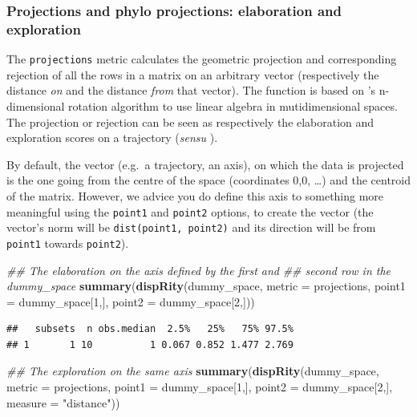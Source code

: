 \documentclass[
]{book}
\newenvironment{Shaded}{\begin{snugshade}}{\end{snugshade}}
\newcommand{\CommentTok}[1]{\textcolor[rgb]{0.56,0.35,0.01}{\textit{#1}}}
\newcommand{\DataTypeTok}[1]{\textcolor[rgb]{0.13,0.29,0.53}{#1}}
\newcommand{\DecValTok}[1]{\textcolor[rgb]{0.00,0.00,0.81}{#1}}
\newcommand{\KeywordTok}[1]{\textcolor[rgb]{0.13,0.29,0.53}{\textbf{#1}}}
\newcommand{\NormalTok}[1]{#1}
\newcommand{\StringTok}[1]{\textcolor[rgb]{0.31,0.60,0.02}{#1}}
\begin{document}
\hypertarget{projections}{%
\subsubsection{Projections and phylo projections: elaboration and exploration}\label{projections}}

The \texttt{projections} metric calculates the geometric projection and corresponding rejection of all the rows in a matrix on an arbitrary vector (respectively the distance \emph{on} and the distance \emph{from} that vector). The function is based on \citet{aguilera2004}'s n-dimensional rotation algorithm to use linear algebra in mutidimensional spaces. The projection or rejection can be seen as respectively the elaboration and exploration scores on a trajectory (\emph{sensu} \citet{endler2005}).

By default, the vector (e.g.~a trajectory, an axis), on which the data is projected is the one going from the centre of the space (coordinates 0,0, \ldots) and the centroid of the matrix.
However, we advice you do define this axis to something more meaningful using the \texttt{point1} and \texttt{point2} options, to create the vector (the vector's norm will be \texttt{dist(point1,\ point2)} and its direction will be from \texttt{point1} towards \texttt{point2}).

\begin{Shaded}
\begin{Highlighting}[]
\CommentTok{\#\# The elaboration on the axis defined by the first and}
\CommentTok{\#\# second row in the dummy\_space}
\KeywordTok{summary}\NormalTok{(}\KeywordTok{dispRity}\NormalTok{(dummy\_space, }\DataTypeTok{metric =}\NormalTok{ projections,}
                              \DataTypeTok{point1 =}\NormalTok{ dummy\_space[}\DecValTok{1}\NormalTok{,],}
                              \DataTypeTok{point2 =}\NormalTok{ dummy\_space[}\DecValTok{2}\NormalTok{,]))}
\end{Highlighting}
\end{Shaded}

\begin{verbatim}
##   subsets  n obs.median  2.5%   25%   75% 97.5%
## 1       1 10          1 0.067 0.852 1.477 2.769
\end{verbatim}

\begin{Shaded}
\begin{Highlighting}[]
\CommentTok{\#\# The exploration on the same axis}
\KeywordTok{summary}\NormalTok{(}\KeywordTok{dispRity}\NormalTok{(dummy\_space, }\DataTypeTok{metric =}\NormalTok{ projections,}
                              \DataTypeTok{point1 =}\NormalTok{ dummy\_space[}\DecValTok{1}\NormalTok{,],}
                              \DataTypeTok{point2 =}\NormalTok{ dummy\_space[}\DecValTok{2}\NormalTok{,],}
                              \DataTypeTok{measure =} \StringTok{"distance"}\NormalTok{))}
\end{Highlighting}
\end{Shaded}
\end{document}
